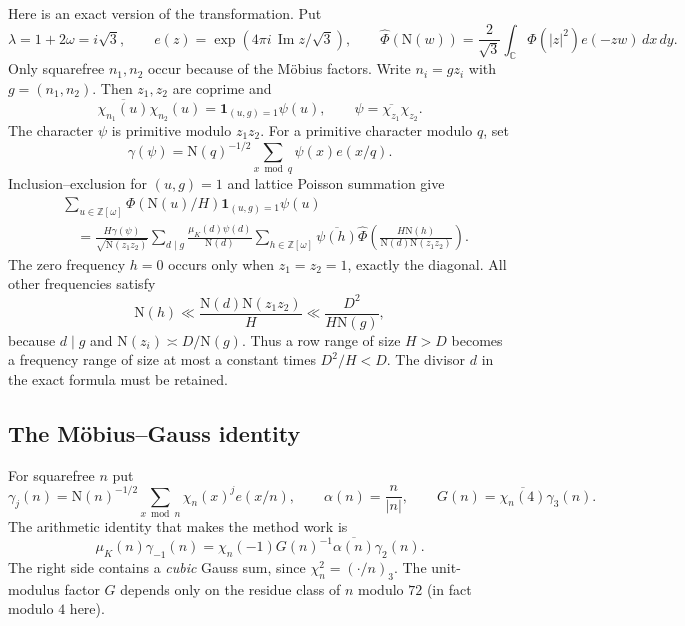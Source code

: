 \documentclass[11pt]{article}
\newcommand{\OO}{\mathbb Z[\omega]}
\newcommand{\N}{\mathrm N}
\newcommand{\muk}{\mu_K}
\newcommand{\ind}{\mathbf 1}
\numberwithin{equation}{section}
\begin{document}
Here is an exact version of the transformation. Put
\begin{equation}\label{eq:poissonnotation}
 \lambda=1+2\omega=i\sqrt3,\qquad
 e(z)=\exp(4\pi i\,\operatorname{Im}z/\sqrt3),\qquad
 \widehat\Phi(\N(w))=\frac2{\sqrt3}
     \int_{\mathbb C}\Phi(|z|^2)e(-zw)\,dx\,dy.
\end{equation}
Only squarefree $n_1,n_2$ occur because of the M\"obius factors. Write
$n_i=gz_i$ with $g=(n_1,n_2)$. Then $z_1,z_2$ are coprime and
\begin{equation}\label{eq:pairedchar}
 \overline{\chi_{n_1}(u)}\chi_{n_2}(u)
 =\ind_{(u,g)=1}\psi(u),\qquad
 \psi=\overline{\chi_{z_1}}\chi_{z_2}.
\end{equation}
The character $\psi$ is primitive modulo $z_1z_2$. For a primitive
character modulo $q$, set
\begin{equation}\label{eq:gammapsi}
 \gamma(\psi)=\N(q)^{-1/2}\sum_{x\bmod q}\psi(x)e(x/q).
\end{equation}
Inclusion--exclusion for $(u,g)=1$ and lattice Poisson summation give
\begin{equation}\label{eq:poissonexact}
 \begin{split}
 &\sum_{u\in\OO}\Phi(\N(u)/H)\ind_{(u,g)=1}\psi(u)\\
 &\quad=\frac{H\gamma(\psi)}{\sqrt{\N(z_1z_2)}}
 \sum_{d\mid g}\frac{\muk(d)\psi(d)}{\N(d)}
 \sum_{h\in\OO}\overline{\psi(h)}
 \widehat\Phi\left(\frac{H\N(h)}{\N(d)\N(z_1z_2)}\right).
 \end{split}
\end{equation}
The zero frequency $h=0$ occurs only when $z_1=z_2=1$, exactly the
diagonal. All other frequencies satisfy
\begin{equation}\label{eq:freqrange}
 \N(h)\ll\frac{\N(d)\N(z_1z_2)}H
       \ll\frac{D^2}{H\N(g)},
\end{equation}
because $d\mid g$ and $\N(z_i)\asymp D/\N(g)$. Thus a row range of size
$H>D$ becomes a frequency range of size at most a constant times
$D^2/H<D$. The divisor $d$ in the exact formula must be retained.

\subsection{The M\"obius--Gauss identity}
For squarefree $n$ put
\begin{equation}\label{eq:gammaj}
 \gamma_j(n)=\N(n)^{-1/2}\sum_{x\bmod n}\chi_n(x)^j e(x/n),\qquad
 \alpha(n)=\frac n{|n|},\qquad G(n)=\overline{\chi_n(4)}\gamma_3(n).
\end{equation}
The arithmetic identity that makes the method work is
\begin{equation}\label{eq:gauss}
 \muk(n)\gamma_{-1}(n)
 =\chi_n(-1)G(n)^{-1}\overline{\alpha(n)}\gamma_2(n).
\end{equation}
The right side contains a \emph{cubic} Gauss sum, since
$\chi_n^2=(\cdot/n)_3$. The unit-modulus factor $G$ depends only on
the residue class of $n$ modulo $72$ (in fact modulo $4$ here).
\end{document}
